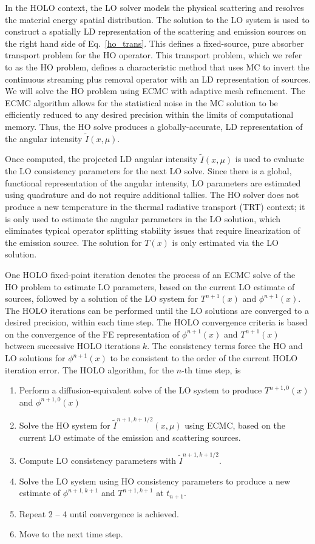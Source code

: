 \documentclass{mc2013}
\begin{document}
In the HOLO context, the LO solver models the physical scattering and
resolves the material energy spatial distribution.  
The solution to the LO system is used to construct a spatially LD representation of
the scattering and emission sources on the right hand side of Eq.~\eqref{ho_trans}.  This defines a fixed-source, pure absorber
transport problem for the HO operator. This transport problem, which we refer to as
the HO problem, defines a characteristic method that uses MC to
invert the continuous streaming plus removal operator with an LD representation of
sources. We will solve the HO problem using ECMC with adaptive mesh
refinement. The ECMC algorithm allows for the statistical noise in the MC
solution to be efficiently reduced to any desired precision within the limits of
computational memory.  Thus, the HO solve produces a
globally-accurate, LD representation of the angular intensity
$\tilde{I}(x,\mu)$.  

Once computed, the projected LD
angular intensity $\tilde{I}(x,\mu)$ is used to evaluate the LO
consistency parameters for the next LO solve.  Since there is a global, functional representation of
the angular intensity,  LO parameters are estimated using quadrature and do not require additional tallies.  The HO solver does not
produce a new temperature in the thermal radiative transport (TRT) context; it is
only used to estimate the angular parameters in the LO solution, which eliminates
typical operator splitting stability issues that require linearization of the emission source.
 The solution for $T(x)$ is only estimated via the LO solution.

One HOLO fixed-point iteration denotes the process of an ECMC solve of the HO problem to estimate LO parameters, based on
the current LO estimate of sources, followed by a solution of the 
LO system for $T^{n+1}(x)$ and $\phi^{n+1}(x)$.
The HOLO iterations can be performed until the LO solutions are converged to a
desired precision, within each time step. The HOLO convergence criteria is based on
the convergence of the FE representation of $\phi^{n+1}(x)$ and $T^{n+1}(x)$ between successive HOLO iterations
$k$.  
The consistency terms force the HO
and LO solutions for $\phi^{n+1}(x)$ to be consistent to the order of the current HOLO
iteration error.   The HOLO algorithm, for the $n$-th time step, is
\begin{enumerate}
    \item Perform a diffusion-equivalent solve of the LO system to produce $T^{n+1,0}(x)$
        and $\phi^{n+1,0}(x)$ 
\item Solve the HO system for $\tilde{I}^{n+1,k+1/2}(x,\mu)$ using ECMC, based on the current
    LO estimate of the emission and scattering sources.%
\item Compute LO consistency parameters with $\tilde{I}^{n+1,k+1/2}$.  
\item Solve the LO system using HO consistency parameters to produce a new
    estimate of $\phi^{n+1,k+1}$ and $T^{n+1,k+1}$ at $t_{n+1}$.
\item Repeat 2 -- 4 until convergence is achieved.
\item Move to the next time step.
\end{enumerate}
\end{document}
